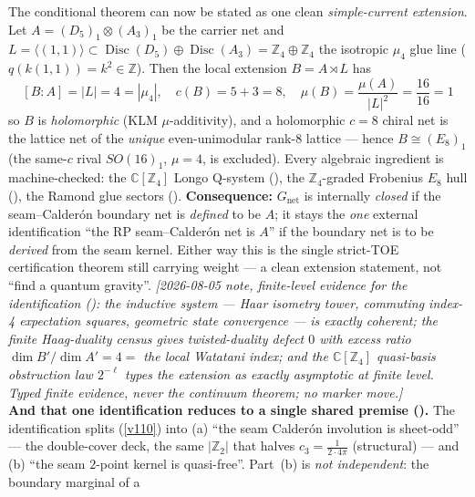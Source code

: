 \documentclass[11pt,a4paper]{article}
\newcommand{\cthree}{c_3}
\newcommand{\Z}{\mathbb Z}
\begin{document}
\begin{keybox}
The conditional theorem can now be stated as one clean \emph{simple-current extension}. Let
$A=(D_5)_1\otimes(A_3)_1$ be the carrier net and $L=\langle(1,1)\rangle\subset\operatorname{Disc}(D_5)\oplus
\operatorname{Disc}(A_3)=\Z_4\oplus\Z_4$ the isotropic $\mu_4$ glue line ($q(k(1,1))=k^2\in\Z$). Then the
local extension $B=A\rtimes L$ has
\[
  \boxed{\ [B:A]=|L|=4=|\mu_4|,\quad c(B)=5{+}3=8,\quad \mu(B)=\frac{\mu(A)}{|L|^2}=\frac{16}{16}=1\ }
\]
so $B$ is \emph{holomorphic} (KLM $\mu$-additivity), and a holomorphic $c{=}8$ chiral net is the lattice net of
the \emph{unique} even-unimodular rank-$8$ lattice --- hence $\boxed{B\cong(E_8)_1}$ (the same-$c$ rival
$SO(16)_1$, $\mu{=}4$, is excluded). Every algebraic ingredient is machine-checked: the $\mathbb C[\Z_4]$ Longo
Q-system (), the $\Z_4$-graded Frobenius $E_8$ hull (),
the Ramond glue sectors (). \textbf{Consequence:} $G_{\mathrm{net}}$ is internally
\emph{closed} if the seam--Calder\'on boundary net is \emph{defined} to be $A$; it stays the \emph{one} external
identification ``the RP seam--Calder\'on net is $A$'' if the boundary net is to be \emph{derived} from the seam
kernel. Either way this is the single strict-TOE certification theorem still carrying weight --- a clean
extension statement, not ``find a quantum gravity''.
\emph{[2026-08-05 note, finite-level evidence for the identification
(): the inductive system --- Haar isometry tower, commuting index-4
expectation squares, geometric state convergence --- is exactly coherent; the finite Haag-duality census
gives twisted-duality defect $0$ with excess ratio $\dim B'/\dim A'=4=$ the local Watatani index; and the
$\mathbb C[\Z_4]$ quasi-basis obstruction law $2^{-\ell}$ types the extension as exactly asymptotic at
finite level.  Typed finite evidence, never the continuum theorem; no marker move.]}
\smallskip\\
\noindent\textbf{And that one identification reduces to a single shared premise ().}
The identification splits (\vref{v110}) into (a) ``the seam Calder\'on involution is sheet-odd'' --- the
double-cover deck, the same $|\Z_2|$ that halves $\cthree=\tfrac1{2\cdot4\pi}$ (structural) --- and (b) ``the
seam $2$-point kernel is quasi-free''. Part~(b) is \emph{not independent}: the boundary marginal of a

\end{keybox}
\end{document}
